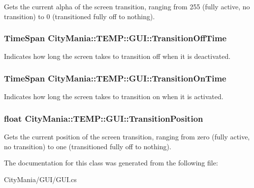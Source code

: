 Gets the current alpha of the screen transition, ranging from 255 (fully active, no transition) to 0 (transitioned fully off to nothing). \hypertarget{classCityMania_1_1TEMP_1_1GUI_abbc109958a9298a2948c408e941ad538}{
\subsubsection[{TransitionOffTime}]{\setlength{\rightskip}{0pt plus 5cm}TimeSpan CityMania::TEMP::GUI::TransitionOffTime}}
\label{classCityMania_1_1TEMP_1_1GUI_abbc109958a9298a2948c408e941ad538}


Indicates how long the screen takes to transition off when it is deactivated. \hypertarget{classCityMania_1_1TEMP_1_1GUI_ae01a201eb5d0f8869e74f887b8a4f496}{
\subsubsection[{TransitionOnTime}]{\setlength{\rightskip}{0pt plus 5cm}TimeSpan CityMania::TEMP::GUI::TransitionOnTime}}
\label{classCityMania_1_1TEMP_1_1GUI_ae01a201eb5d0f8869e74f887b8a4f496}


Indicates how long the screen takes to transition on when it is activated. \hypertarget{classCityMania_1_1TEMP_1_1GUI_a020b4f1b79ea5a07de5f87c1156dabed}{
\subsubsection[{TransitionPosition}]{\setlength{\rightskip}{0pt plus 5cm}float CityMania::TEMP::GUI::TransitionPosition}}
\label{classCityMania_1_1TEMP_1_1GUI_a020b4f1b79ea5a07de5f87c1156dabed}


Gets the current position of the screen transition, ranging from zero (fully active, no transition) to one (transitioned fully off to nothing). 

The documentation for this class was generated from the following file:\begin{DoxyCompactItemize}
\item 
CityMania/GUI/GUI.cs\end{DoxyCompactItemize}
